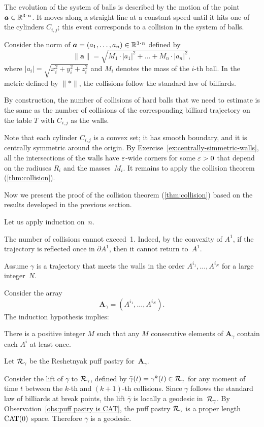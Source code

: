The evolution of the system
of balls is described by the motion of
the point $\bm{a}\in\RR^{3\cdot n}$.
It moves along a straight line at a
constant speed until it hits one of the cylinders $C_{i,j}$; 
this event corresponds
to a collision in the system of balls.

Consider the norm of $\bm{a}=(a_1,\dots,a_n)\in \RR^{3\cdot n}$ defined by
\[\lVert \bm{a}\rVert
=
\sqrt{M_1\cdot|a_1|^2+\dots+M_n\cdot |a_n|^2},\]
where $|a_i|=\sqrt{x_i^2+y_i^2+z_i^2}$ 
and $M_i$ denotes the mass of the $i$-th ball.
In the metric defined by $\lVert {*}\rVert$,
the collisions follow the
standard law of billiards. 

By construction, the number of collisions of hard balls that we need to estimate 
is the same as the number of collisions of the corresponding billiard trajectory on the table $T$ with $C_{i,j}$ as the walls.

Note that each cylinder $C_{i,j}$ is a convex set;
it has smooth boundary, 
and it is centrally symmetric around the origin.
By Exercise~\ref{ex:centrally-simmetric-walls}, all the intersections of the walls have $\varepsilon$-wide corners for some $\varepsilon>0$ that depend on the radiuses $R_i$ and the masses~$M_i$.
It remains to apply the collision theorem (\ref{thm:collision}).
\qeds

Now we present the proof of the collision theorem (\ref{thm:collision})
based on the results developed in the previous section.

Let us apply induction on~$n$.

The number of collisions cannot exceed~1.  
Indeed, by the convexity of $A^1$,
if the trajectory is reflected once in $\partial A^1$, 
then it cannot return to~$A^1$. 

Assume $\gamma$ is a trajectory that  meets the walls in the order $A^{i_1},\dots,A^{i_N}$ for a large integer~$N$.

Consider the array 
\[\bm{A}_\gamma=(A^{i_1},\dots,A^{i_N}).\]
The induction hypothesis implies:

\begin{clm}{}\label{clm:collision-induction hypothesis}
There is a positive integer $M$ such that any $M$ consecutive elements of $\bm{A}_\gamma$ contain each $A^i$ at least once.
\end{clm}

Let $\mathcal{R}_\gamma $ be  the  Reshetnyak puff pastry for~$\bm{A}_\gamma$.

Consider the lift of $\gamma$ to $\mathcal{R}_\gamma$,
defined by 
$\bar\gamma(t)=\gamma^k(t)\in \mathcal{R}_\gamma$ 
for any moment of time $t$ between the $k$-th and $(k+1)$-th collisions.  
Since $\gamma$ follows  the standard law of billiards at break points, the lift $\bar\gamma$ is locally a geodesic in~$\mathcal{R}_\gamma$.
By Observation~\ref{obs:puff pastry is CAT},
the puff pastry $\mathcal{R}_\gamma$ is a proper length $\mathrm{CAT}(0)$ space.
Therefore $\bar\gamma$ is a geodesic.

